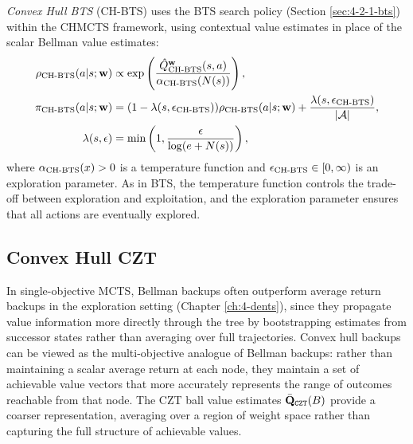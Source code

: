     \textit{Convex Hull BTS} (CH-BTS) uses the BTS search policy (Section \ref{sec:4-2-1-bts}) within the CHMCTS framework, using contextual value estimates in place of the scalar Bellman value estimates:
    \begin{align}
        {\rho_{{\textnormal{CH-BTS}}}}(a|s;\mathbf{w}) &\propto \exp\left(
            \frac{{\hat{Q}^{\mathbf{w}}_{{\textnormal{CH-BTS}}}}(s,a)}
            {{\alpha_{{\textnormal{CH-BTS}}}}(N(s))}\right), 
            \label{eq:5:chbts_rho} \\
        {\pi_{{\textnormal{CH-BTS}}}}(a|s;\mathbf{w}) &= (1-{\lambda(s,{\epsilon_{{\textnormal{CH-BTS}}}})})
            {\rho_{{\textnormal{CH-BTS}}}}(a|s;\mathbf{w}) 
            + \frac{{\lambda(s,{\epsilon_{{\textnormal{CH-BTS}}}})}}{|\mathcal{A}|}, 
            \label{eq:5:chbts_policy} \\
        \lambda(s,\epsilon) &= \min\left(1, 
            \frac{\epsilon}{\log(e+N(s))}\right),
    \end{align}
    where ${\alpha_{{\textnormal{CH-BTS}}}}(x) > 0$ is a temperature function and ${\epsilon_{{\textnormal{CH-BTS}}}} \in [0,\infty)$ is an exploration parameter. As in BTS, the temperature function controls the trade-off between exploration and exploitation, and the exploration parameter ensures that all actions are eventually explored.


\subsection{Convex Hull CZT}
\label{sec:5-3-4-chczt}

    In single-objective MCTS, Bellman backups often outperform average return backups in the exploration setting (Chapter \ref{ch:4-dents}), since they propagate value information more directly through the tree by bootstrapping estimates from successor states rather than averaging over full trajectories. Convex hull 
    backups can be viewed as the multi-objective analogue of 
    Bellman backups: rather than maintaining a scalar average 
    return at each node, they maintain a set of achievable 
    value vectors that more accurately represents the range 
    of outcomes reachable from that node. The CZT ball value 
    estimates $\bar{\mathbf{Q}}_{\textnormal{\texttt{CZT}}}(B)$ provide a coarser representation, 
    averaging over a region of weight space rather than 
    capturing the full structure of achievable values.

